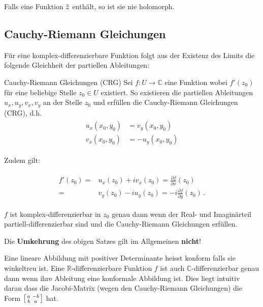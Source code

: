 \documentclass[a4paper,10pt]{article}
\def\R{\mathbb{R}}
\def\C{\mathbb{C}}
\newcommand{\overbar}[1]{\mkern 1.5mu\overline{\mkern-1.5mu#1\mkern-1.5mu}\mkern 1.5mu}
\begin{document}
Falls eine Funktion $\overbar{z}$ enthält, so ist sie nie holomorph.

\subsection{Cauchy-Riemann Gleichungen}

Für eine komplex-differenzierbare Funktion folgt aus der Existenz des Limits die folgende Gleichheit der partiellen Ableitungen:

\begin{mainbox}{Cauchy-Riemann Gleichungen (CRG)}
  Sei \(f \colon U \to \mathbb{C}\) eine Funktion wobei \(f'(z_0)\) für eine beliebige Stelle \(z_0 \in U\) existiert. So existieren die partiellen Ableitungen \(u_x,u_y,v_x,v_y\) an der Stelle \(z_0\) und erfüllen die Cauchy‐Riemann Gleichungen (CRG), d.h.
  \begin{align*} 
    \begin{aligned}
       u_x (x_0,y_0)&=v_y (x_0,y_0)\\ 
       v_x (x_0,y_0) &=-u_y (x_0,y_0)
    \end{aligned}
  \end{align*}
  
  Zudem gilt:
  
  \begin{align*}
    \begin{aligned}
      f'(z_0) =& u_x(z_0) + i v_x (z_0) = \frac{\partial f}{\partial x}(z_0)\\
       =& v_y(z_0) - i u_y (z_0) = - i \frac{\partial f}{\partial y}(z_0)\,. 
    \end{aligned}
  \end{align*}

  $f$ ist komplex-differenzierbar in $z_0$ genau dann wenn der Real- und Imaginärteil partiell-differenzierbar sind und die Cauchy-Riemann Gleichungen erfüllen.
\end{mainbox}

Die \textbf{Umkehrung} des obigen Satzes gilt im Allgemeinen \textbf{nicht}!

Eine lineare Abbildung mit positiver Determinante heisst konform falls sie winkeltreu ist. Eine $\R$-differenzierbare Funktion $f$ ist auch $\C$-differenzierbar genau dann wenn ihre Ableitung eine konformale Abbildung ist. Dies liegt intuitiv daran dass die Jacobi-Matrix (wegen den Cauchy-Riemann Gleichungen) die Form $\begin{bsmallmatrix}
  a & -b\\
  b & a
\end{bsmallmatrix}$ hat.
\end{document}
